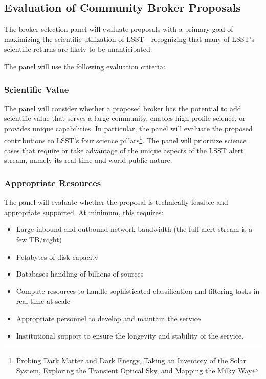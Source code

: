 \subsection{Evaluation of Community Broker Proposals} \label{sec:evaluation}

The broker selection panel will evaluate proposals with a primary goal of maximizing the scientific utilization of LSST---recognizing that many of LSST's scientific returns are likely to be unanticipated.

The panel will use the following evaluation criteria:

\subsubsection{Scientific Value}

The panel will consider whether a proposed broker has the potential to add scientific value that serves a large community, enables high-profile science, or provides unique capabilities.
In particular, the panel will evaluate the proposed contributions to LSST's four science pillars\footnote{Probing Dark Matter and Dark Energy, Taking an Inventory of the Solar System, Exploring the Transient Optical Sky, and Mapping the Milky Way}.
The panel will prioritize science cases that require or take advantage of the unique aspects of the LSST alert stream, namely its real-time and world-public nature.

\subsubsection{Appropriate Resources}

The panel will evaluate whether the proposal is technically feasible and appropriate supported.  At minimum, this requires:

\begin{itemize}
	\item Large inbound and outbound network bandwidth (the full alert stream is a few TB/night)
	\item Petabytes of disk capacity
	\item Databases handling of billions of sources
	\item Compute resources to handle sophisticated classification and filtering tasks in real time at scale
	\item Appropriate personnel to develop and maintain the service
	\item Institutional support to ensure the longevity and stability of the service.
\end{itemize}


